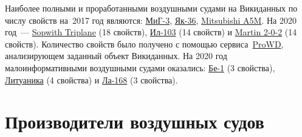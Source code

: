 
Наиболее полными и проработанными воздушными судами на Викиданных по числу свойств 
на~2017 год являются: \href{https://www.wikidata.org/wiki/Q271446}{МиГ-3}, 
\href{https://www.wikidata.org/wiki/Q1349098}{Як-36}, 
\href{https://www.wikidata.org/wiki/Q429839}{Mitsubishi A5M}. 
На 2020 год~--- \href{https://www.wikidata.org/wiki/Q770863}{Sopwith Triplane} (18 свойств), 
\href{https://www.wikidata.org/wiki/Q1658673}{Ил-103} (14 свойств) и 
\href{https://www.wikidata.org/wiki/Q665071}{Martin 2-0-2} (14 свойств).
Количество свойств было получено с помощью сервиса~\href{https://prowd.id/dashboards/972cd00ce110/profile}{ProWD}\autocite{aircraft_prowd}, 
анализирующем заданный объект Викиданных.
На 2020 год малоинформативными воздушными судами оказались: 
\href{https://www.wikidata.org/wiki/Q820603}{Бе-1} (3 свойства), 
\href{https://www.wikidata.org/wiki/Q117984}{Литуаника} (4 свойства) и 
\href{https://www.wikidata.org/wiki/Q572762}{Ла-168} (3 свойства).



\section{Производители воздушных судов}%
\marginnote{\MarginQuestion У каких из представленных ниже российских производителей самолётов есть веб-сайты?%
\begin{itemize}
\item \ruwiki{vDw}{МиГ}
\item \ruwiki{vDx}{Саратовский авиационный завод}
\item \ruwiki{vDy}{Туполев}
\item \ruwiki{vDz}{Сухой}
\end{itemize}
См. ответ~\ref{answer:aircraft_manufacturers} на с.~\pageref{answer:aircraft_manufacturers}.
}

